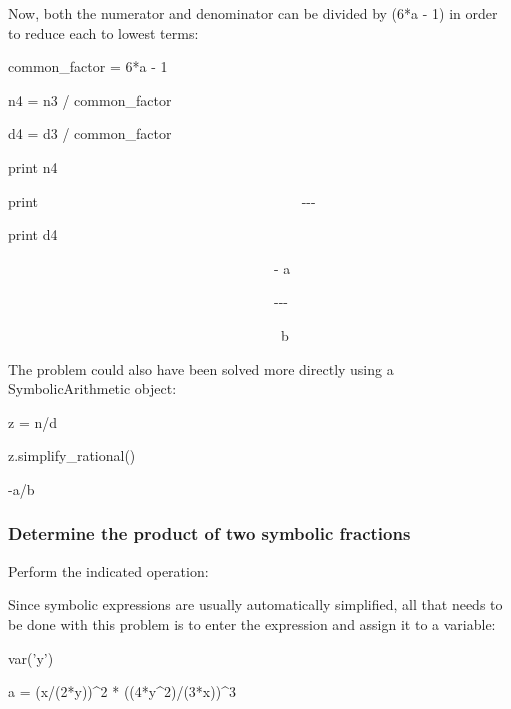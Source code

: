 \documentclass[12pt,oneside]{book}
\begin{document}
{\textquotedbl}{\textquotedbl}{\textquotedbl}

Now, both the numerator and denominator can be divided by (6*a {}- 1) in order to reduce each to lowest terms:

{\textquotedbl}{\textquotedbl}{\textquotedbl}

common\_factor = 6*a {}- 1

n4 = n3 / common\_factor

d4 = d3 / common\_factor

print n4

print {\textquotedbl}
\ \ \ \ \ \ \ \ \ \ \ \ \ \ \ \ \ \ \ \ \ \ \ \ \ \ \ \ \ \ \ \ \ \ \ \ \ {}-{}-{}-{\textquotedbl}

print d4

{\textbar}

\ \ \ \ \ \ \ \ \ \ \ \ \ \ \ \ \ \ \ \ \ \ \ \ \ \ \ \ \ \ \ \ \ \ \ \ \ \ {}-
a

\ \ \ \ \ \ \ \ \ \ \ \ \ \ \ \ \ \ \ \ \ \ \ \ \ \ \ \ \ \ \ \ \ \ \ \ \ \ {}-{}-{}-

\ \ \ \ \ \ \ \ \ \ \ \ \ \ \ \ \ \ \ \ \ \ \ \ \ \ \ \ \ \ \ \ \ \ \ \ \ \ \ b


{\textquotedbl}{\textquotedbl}{\textquotedbl}

The problem could also have been solved more directly using a SymbolicArithmetic object:

{\textquotedbl}{\textquotedbl}{\textquotedbl}

z = n/d

z.simplify\_rational()

{\textbar}

{}-a/b


\subsubsection[Determine the product of two symbolic fractions]{Determine the product of two symbolic fractions}

Perform the indicated operation: 


{\textquotedbl}{\textquotedbl}{\textquotedbl}

Since symbolic expressions are usually automatically simplified, all that needs to be done with this problem is to enter the expression and assign it to a variable:

{\textquotedbl}{\textquotedbl}{\textquotedbl}


var('y')

a = (x/(2*y))\^{}2 * ((4*y\^{}2)/(3*x))\^{}3
\end{document}
